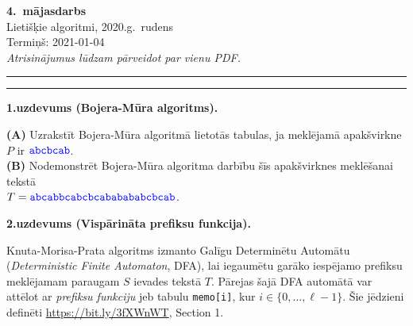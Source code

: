 \documentclass[a4paper,12pt]{article}
\begin{document}
\thispagestyle{empty}

\begin{center}
{\bf\Huge 4.\ mājasdarbs} \\[5pt]
Lietišķie algoritmi, 2020.g.\ rudens \\
Termiņš: 2021-01-04\\[5pt]
{\em Atrisinājumus lūdzam pārveidot par vienu PDF.}
\end{center}

\hrule
\vspace{2pt}
\hrule
\vspace{12pt}






\vspace{10pt}
{\bf 1.uzdevums (Bojera-Mūra algoritms).}

{\bf (A)} Uzrakstīt Bojera-Mūra algoritmā lietotās ta\-bu\-las, ja meklējamā 
apakšvirkne $P$ ir $\textcolor{blue}{\mathtt{abcbcab}}$.\\
{\bf (B)} Nodemonstrēt Bojera-Mūra algoritma darbību šīs apakšvirknes 
meklēšanai tekstā\\ $T = \textcolor{blue}{\mathtt{abcabbcabcbcababababcbcab}}$.



\vspace{10pt}
{\bf 2.uzdevums (Vispārināta prefiksu funkcija).}

Knuta-Morisa-Prata algoritms izmanto Ga\-lī\-gu De\-ter\-mi\-nē\-tu Automātu ({\em Deterministic Finite Automaton}, DFA), 
lai iegaumētu garāko iespējamo prefiksu meklējamam paraugam $S$ ievades tekstā $T$. 
Pārejas šajā DFA automātā var attēlot ar {\em prefiksu funkciju} jeb tabulu {\tt memo[i]}, 
kur $i \in \{ 0,\ldots,\ell{}-1 \}$. Šie jēdzieni definēti \url{https://bit.ly/3fXWnWT}, Section 1. 
\end{document}
